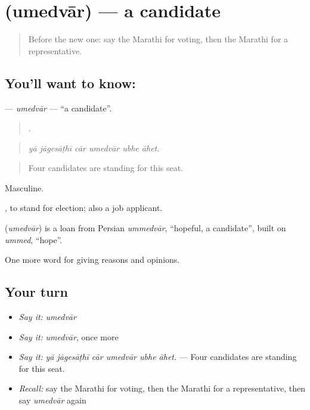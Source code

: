 \section[\texorpdfstring{\mr{उमेदवार} (umedvār)}{उमेदवार (umedvār)}]{ (umedvār) — a candidate}

\label{lesson:MR-C355-umedvar}



\begin{quote}
Before the new one: say the Marathi for voting, then the Marathi for a representative.
\end{quote}

\subsection*{You'll want to know: }
\textbf{} — \emph{umedvār} — \textquotedblleft{}a candidate\textquotedblright{}.

\begin{quote}
     .
\end{quote}

\begin{quote}
\emph{yā jāgesāṭhī cār umedvār ubhe āhet.}
\end{quote}

\begin{quote}
Four candidates are standing for this seat.
\end{quote}

Masculine.

 , to stand for election; also a job applicant.

\begin{cousinweb}
\textbf{} (\emph{umedvār}) is a loan from Persian \emph{ummedvār}, \textquotedblleft{}hopeful, a candidate\textquotedblright{}, built on \emph{ummed}, \textquotedblleft{}hope\textquotedblright{}.
\end{cousinweb}

\begin{grammarlens}[title={What you've built}]
One more word for giving reasons and opinions.
\end{grammarlens}

\subsection*{Your turn}
\begin{itemize}
\raggedright
  \item \emph{Say it:} \emph{umedvār}
  \item \emph{Say it:} \emph{umedvār}, once more
  \item \emph{Say it:} \emph{yā jāgesāṭhī cār umedvār ubhe āhet.} — Four candidates are standing for this seat.
  \item \emph{Recall:} say the Marathi for voting, then the Marathi for a representative, then say \emph{umedvār} again
\end{itemize}

